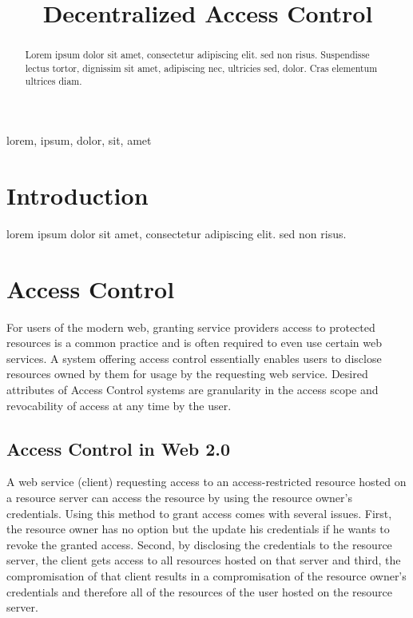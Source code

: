 \documentclass[conference]{IEEEtran}
\begin{document}
\title{Decentralized Access Control}%

\author{
}

\maketitle

\begin{abstract}
  Lorem ipsum dolor sit amet, consectetur adipiscing elit. sed non risus. Suspendisse lectus tortor, dignissim sit amet, adipiscing nec, ultricies sed, dolor. Cras elementum ultrices diam.
\end{abstract}

\begin{IEEEkeywords}
  lorem, ipsum, dolor, sit, amet
\end{IEEEkeywords}

\section{Introduction}
lorem ipsum dolor sit amet, consectetur adipiscing elit. sed non risus.

\section{Access Control}
For users of the modern web, granting service providers access to protected resources is a common practice and is often required to even use certain web services.
A system offering access control essentially enables users to disclose resources owned by them for usage by the requesting web service.
Desired attributes of Access Control systems are granularity in the access scope and revocability of access at any time by the user.

\subsection{Access Control in Web 2.0}
A web service (client) requesting access to an access-restricted resource hosted on a resource server can access the resource by using the resource owner's credentials.
Using this method to grant access comes with several issues.
First, the resource owner has no option but the update his credentials if he wants to revoke the granted access.
Second, by disclosing the credentials to the resource server, the client gets access to all resources hosted on that server and third, the compromisation of that client results in a compromisation of the resource owner's credentials and therefore all of the resources of the user hosted on the resource server.
\end{document}
